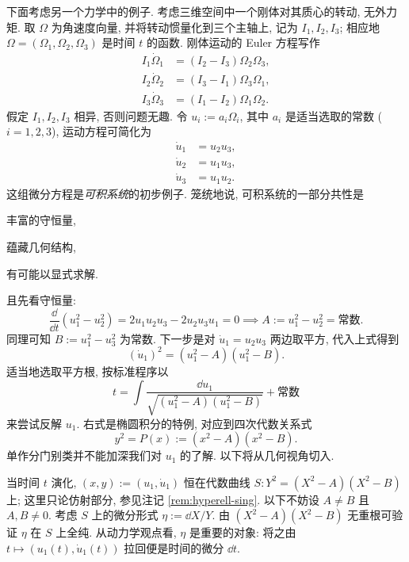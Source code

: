 \begin{example}
	下面考虑另一个力学中的例子. 考虑三维空间中一个刚体对其质心的转动, 无外力矩. 取 $\Omega$ 为角速度向量, 并将转动惯量化到三个主轴上, 记为 $I_1, I_2, I_3$; 相应地 $\Omega = (\Omega_1, \Omega_2, \Omega_3)$ 是时间 $t$ 的函数. 刚体运动的 Euler 方程写作
	\begin{align*}
		I_1 \dot\Omega_1 & = (I_2 - I_3) \Omega_2 \Omega_3, \\
		I_2 \dot\Omega_2 & = (I_3 - I_1) \Omega_3 \Omega_1, \\
		I_3 \dot\Omega_3 & = (I_1 - I_2) \Omega_1 \Omega_2.
	\end{align*}
	假定 $I_1, I_2, I_3$ 相异, 否则问题无趣. 令 $u_i := a_i \Omega_i$, 其中 $a_i$ 是适当选取的常数 ($i = 1, 2, 3$), 运动方程可简化为
	\begin{align*}
		\dot{u}_1 & = u_2 u_3, \\
		\dot{u}_2 & = u_1 u_3, \\
		\dot{u}_3 & = u_1 u_2.
	\end{align*}
	这组微分方程是\emph{可积系统}的初步例子. 笼统地说, 可积系统的一部分共性是
	\begin{compactitem}
		\item 丰富的守恒量,
		\item 蕴藏几何结构,
		\item 有可能以显式求解.
	\end{compactitem}
	且先看守恒量:
	\[ \frac{\dd}{\dd t} \left(u_1^2 - u_2^2\right) = 2u_1 u_2 u_ 3 - 2u_2 u_3 u_1 = 0 \implies A := u_1^2 - u_2^2 = \text{常数}. \]
	同理可知 $B := u_1^2 - u_3^2$ 为常数. 下一步是对 $\dot{u}_1 = u_2 u_3$ 两边取平方, 代入上式得到
	\[ (\dot{u}_1)^2 = \left(u_1^2 - A\right) \left( u_1^2 - B \right). \]
	适当地选取平方根, 按标准程序以
	\[ t = \int \dfrac{\dd u_1}{ \sqrt{\left(u_1^2 - A\right) \left(u_1^2 - B\right)} } + \text{常数} \]
	来尝试反解 $u_1$. 右式是椭圆积分的特例, 对应到四次代数关系式
	\[ y^2 = P(x) := \left(x^2 - A\right) \left(x^2 - B\right). \]
	单作分门别类并不能加深我们对 $u_1$ 的了解. 以下将从几何视角切入.

	当时间 $t$ 演化, $(x,y) := (u_1, \dot{u}_1)$ 恒在代数曲线 $S: Y^2 = (X^2 - A)(X^2 - B)$ 上; 这里只论仿射部分, 参见注记 \ref{rem:hyperell-sing}. 以下不妨设 $A \neq B$ 且 $A,B \neq 0$. 考虑 $S$ 上的微分形式 $\eta := \dd X \big/ Y$. 由 $(X^2 -A)(X^2-B)$ 无重根可验证 $\eta$ 在 $S$ 上全纯. 从动力学观点看, $\eta$ 是重要的对象: 将之由 $t \mapsto (u_1(t), \dot{u}_1(t))$ 拉回便是时间的微分 $\dd t$.
	

\end{example}
